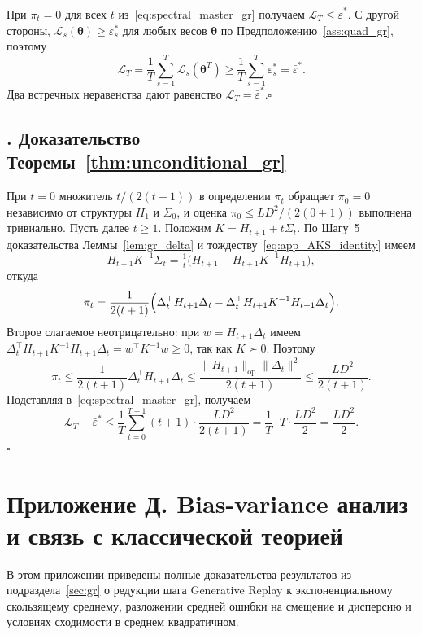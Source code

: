 \documentclass[a4paper,14pt,oneside,openany]{extarticle}
\newcommand{\cL}{\mathcal{L}}
\newcommand{\btheta}{\boldsymbol{\theta}}
\begin{document}
При $\pi_t = 0$ для всех $t$ из~\eqref{eq:spectral_master_gr} получаем $\cL_T \le \bar\varepsilon^*$. С другой стороны, $\cL_s(\btheta) \ge \varepsilon^*_s$ для любых весов $\btheta$ по Предположению~\ref{ass:quad_gr}, поэтому
\[
    \cL_T = \frac{1}{T}\sum_{s=1}^T \cL_s(\btheta^T) \ge \frac{1}{T}\sum_{s=1}^T \varepsilon^*_s = \bar\varepsilon^*.
\]
Два встречных неравенства дают равенство $\cL_T = \bar\varepsilon^*$.\hfill$\square$

\subsection*{\theappthm. Доказательство Теоремы~\ref{thm:unconditional_gr}}\label{app:proof_unconditional_gr}

При $t = 0$ множитель $t/(2(t+1))$ в определении $\pi_t$ обращает $\pi_0 = 0$ независимо от структуры $H_1$ и $\Sigma_0$, и оценка $\pi_0 \le LD^2/(2(0+1))$ выполнена тривиально. Пусть далее $t \ge 1$. Положим $K = H_{t+1} + t\Sigma_t$. По Шагу~5 доказательства Леммы~\ref{lem:gr_delta} и тождеству~\eqref{eq:app_AKS_identity} имеем
\[
    H_{t+1} K^{-1}\Sigma_t = \tfrac{1}{t}\bigl(H_{t+1} - H_{t+1} K^{-1} H_{t+1}\bigr),
\]
откуда
\[
    \pi_t = \frac{1}{2(t+1)}\Bigl(\Delta_t^\top H_{t+1}\Delta_t - \Delta_t^\top H_{t+1} K^{-1} H_{t+1}\Delta_t\Bigr).
\]
Второе слагаемое неотрицательно: при $w = H_{t+1}\Delta_t$ имеем $\Delta_t^\top H_{t+1} K^{-1} H_{t+1}\Delta_t = w^\top K^{-1} w \ge 0$, так как $K \succ 0$. Поэтому
\[
    \pi_t \le \frac{1}{2(t+1)}\Delta_t^\top H_{t+1}\Delta_t \le \frac{\|H_{t+1}\|_{\text{op}}\|\Delta_t\|^2}{2(t+1)} \le \frac{L D^2}{2(t+1)}.
\]
Подставляя в~\eqref{eq:spectral_master_gr}, получаем
\[
    \cL_T - \bar\varepsilon^* \le \frac{1}{T}\sum_{t=0}^{T-1}(t+1)\cdot \frac{L D^2}{2(t+1)} = \frac{1}{T}\cdot T \cdot \frac{L D^2}{2} = \frac{L D^2}{2}.
\]
\hfill$\square$

\newpage
\cleardoublepage
{}
{}
\section*{Приложение Д. Bias-variance анализ и связь с классической теорией}

В этом приложении приведены полные доказательства результатов из подраздела~\ref{sec:gr} о редукции шага Generative Replay к экспоненциальному скользящему среднему, разложении средней ошибки на смещение и дисперсию и условиях сходимости в среднем квадратичном.
\end{document}
